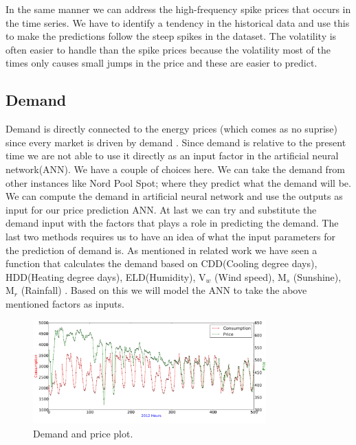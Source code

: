 In the same manner we can address the high-frequency spike prices that occurs in the time series. We have to identify a tendency in the historical data and use this to make the predictions follow the steep spikes in the dataset. The volatility is often easier to handle than the spike prices because the volatility most of the times only causes small jumps in the price and these are easier to predict.

\subsection{Demand}
Demand is directly connected to the energy prices (which comes as no suprise) since every market is driven by demand \cite{singhal2011electricity}. Since demand is relative to the present time we are not able to use it directly as an input factor in the artificial neural network(ANN). We have a couple of choices here. We can take the demand from other instances like Nord Pool Spot; where they predict what the demand will be. We can compute the demand in artificial neural network and use the outputs as input for our price prediction ANN. At last we can try and substitute the demand input with the factors that plays a role in predicting the demand. The last two methods requires us to have an idea of what the input parameters for the prediction of demand is. As mentioned in related work we have seen a function that calculates the demand based on CDD(Cooling degree days), HDD(Heating degree days), ELD(Humidity), V$_w$ (Wind speed), M$_s$ (Sunshine), M$_r$ (Rainfall) \cite{19}. Based on this we will model the ANN to take the above mentioned factors as inputs.

\begin{figure}[H]
\centering
\includegraphics[width=0.8\textwidth ]{billeder/energy_price_plots/price_consump_graph.png}
\caption{Demand and price plot.}
\label{fig:consump_price_graph}
\end{figure}

